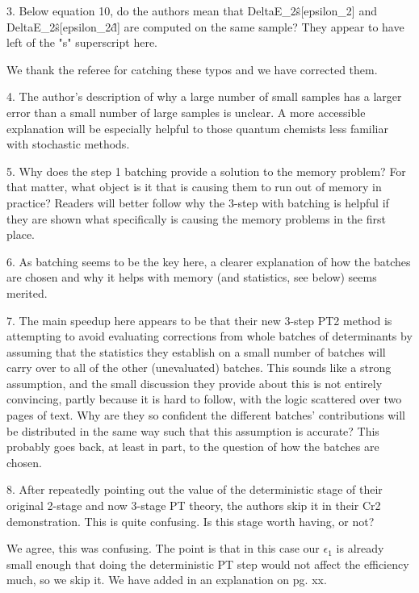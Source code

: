 \documentclass[
preprint,
onecolumn,
 superscriptaddress,
 amsmath,amssymb,
 aps,
]{revtex4-1}
\begin{document}
\vskip 5mm {\color{blue}
3. Below equation 10, do the authors mean that DeltaE\_2\^s[epsilon\_2] and
DeltaE\_2\^s[epsilon\_2\^d] are computed on the same sample? They appear to have left of the
"s" superscript here.
}\color{black}

We thank the referee for catching these typos and we have corrected them.

\vskip 5mm {\color{blue}
4. The author's description of why a large number of small samples has a larger error than
a small number of large samples is unclear. A more accessible explanation will be especially
helpful to those quantum chemists less familiar with stochastic methods.
}\color{black}

\vskip 5mm {\color{blue}

5. Why does the step 1 batching provide a solution to the memory problem? For that matter,
what object is it that is causing them to run out of memory in practice? Readers will better
follow why the 3-step with batching is helpful if they are shown what specifically is causing
the memory problems in the first place.
}\color{black}

\vskip 5mm {\color{blue}

6. As batching seems to be the key here, a clearer explanation of how the batches are chosen
and why it helps with memory (and statistics, see below) seems merited.
}\color{black}

\vskip 5mm {\color{blue}

7. The main speedup here appears to be that their new 3-step PT2 method is attempting to avoid
evaluating corrections from whole batches of determinants by assuming that the statistics
they establish on a small number of batches will carry over to all of the other (unevaluated)
batches. This sounds like a strong assumption, and the small discussion they provide about
this is not entirely convincing, partly because it is hard to follow, with the logic scattered
over two pages of text. Why are they so confident the different batches' contributions will
be distributed in the same way such that this assumption is accurate? This probably goes back,
at least in part, to the question of how the batches are chosen.
}\color{black}

\vskip 5mm {\color{blue}

8. After repeatedly pointing out the value of the deterministic stage of their original
2-stage and now 3-stage PT theory, the authors skip it in their Cr2 demonstration. This is
quite confusing. Is this stage worth having, or not?
}\color{black}

We agree, this was confusing.  The point is that in this case our $\epsilon_1$ is already
small enough that doing the deterministic PT step would not affect the efficiency much,
so we skip it.  We have added in an explanation on pg. xx.
\end{document}
